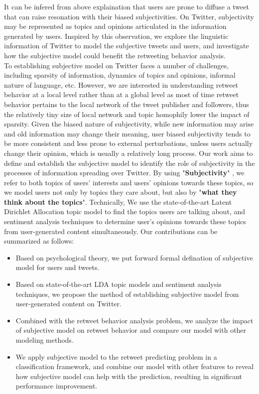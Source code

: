 \documentclass{acm_proc_article-sp}
\begin{document}
It can be infered from above explaination that users are prone to diffuse a tweet that can raise resonation with their biased subjectivities.
On Twitter, subjectivity may be represented as topics and opinions articulated in the information generated by users.  
Inspired by this observation, we explore the linguistic information of Twitter to model the subjective tweets and users, and investigate how the subjective model could benefit the retweeting behavior analysis.\\
To establishing subjective model on Twitter faces a number of challenges, including sparsity of information, dynamics of topics and opinions,  informal nature of language, etc.
However, we are interested in understanding retweet behavior at a local level rather than at a global level as most of time retweet behavior pertains to the local network of the tweet publisher and followers, thus the relatively tiny size of local network and topic homophily lower the impact of sparsity.
Given the biased nature of subjectivity, while new information may arise and old information may change their meaning, user biased subjectivity tends to be more consistent and less prone to external perturbations, unless users actually change their opinion, which is usually a relatively long process.
Our work aims to define and establish the subjective model to identify the role of subjectivity in the processes of information spreading over Twitter.
By using "\textbf{Subjectivity}" , we refer to both topics of users' interests and users' opinions towards these topics, so we model users not only by topics they care about, but also by "\textbf{what they think about the topics}". 
Technically, We use the state-of-the-art Latent Dirichlet Allocation\cite{blei2003latent} topic model to find the topics users are talking about, and sentiment analysis\cite{pang2008opinion} techniques to determine user's opinions towards these topics from user-generated content simultaneously. 
Our contributions can be summarized as follows:
\begin{itemize}
\item Based on psychological theory, we put forward formal defination of subjective model for users and tweets.
\item Based on state-of-the-art LDA topic models and sentiment analysis techniques, we propose the method of establishing subjective 
model from user-generated content on Twitter.
\item Combined with the retweet behavior analysis problem, we analyze the impact of subjective model on retweet behavior and compare our model with other modeling methods.
\item We apply subjective model to the retweet predicting problem in a classification 
framework, and combine our model with other features to reveal how subjective model can help with the prediction, resulting in  significant performance improvement.
\end{itemize}
\end{document}
